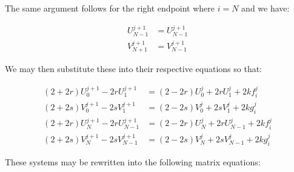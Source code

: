 The same argument follows for the right endpoint where $i=N$ and we have:

\begin{subequations}
\begin{align}
    U_{N-1}^{j+1} &= U_{N-1}^{j+1} \\
    V_{N+1}^{j+1} &= V_{N-1}^{j+1}
\end{align}
\end{subequations}

We may then substitute these into their respective equations so that:

\begin{subequations} \label{eq:rearranged_approx_sys_endpoints}
\begin{align}
    (2+2r) U_{0}^{j+1} - 2r U_{1}^{j+1} &=
        (2-2r) U_{0}^{j} + 2r U_{1}^{j} + 2k f_{i}^{j}
        \\
    (2+2s) V_{0}^{j+1} - 2s V_{1}^{j+1} &=
        (2-2s) V_{0}^{j} + 2s V_{1}^{j} + 2k g_{i}^{j}
        \\
    (2+2r) U_{N}^{j+1} - 2r U_{N-1}^{j+1} &=
        (2-2r) U_{N}^{j} + 2r U_{N-1}^{j} + 2k f_{i}^{j}
        \\
    (2+2s) V_{N}^{j+1} - 2s V_{N-1}^{j+1} &=
        (2-2s) V_{N}^{j} + 2s V_{N-1}^{j} + 2k g_{i}^{j}
\end{align}
\end{subequations}

These systems may be rewritten into the following matrix equations:

